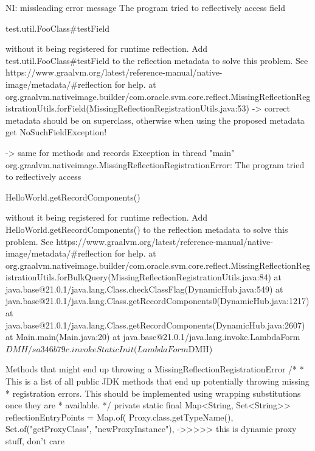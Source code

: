 NI: missleading error message
The program tried to reflectively access field

   test.util.FooClass#testField

 without it being registered for runtime reflection. Add test.util.FooClass#testField to the reflection metadata to solve this problem. See https://www.graalvm.org/latest/reference-manual/native-image/metadata/#reflection for help.
	at org.graalvm.nativeimage.builder/com.oracle.svm.core.reflect.MissingReflectionRegistrationUtils.forField(MissingReflectionRegistrationUtils.java:53)
-> correct metadata should be on superclass, otherwise when using the proposed metadata get NoSuchFieldException!

-> same for methods and records
Exception in thread "main" org.graalvm.nativeimage.MissingReflectionRegistrationError: The program tried to reflectively access

   HelloWorld.getRecordComponents()

 without it being registered for runtime reflection. Add HelloWorld.getRecordComponents() to the reflection metadata to solve this problem. See https://www.graalvm.org/latest/reference-manual/native-image/metadata/#reflection for help.
	at org.graalvm.nativeimage.builder/com.oracle.svm.core.reflect.MissingReflectionRegistrationUtils.forBulkQuery(MissingReflectionRegistrationUtils.java:84)
	at java.base@21.0.1/java.lang.Class.checkClassFlag(DynamicHub.java:549)
	at java.base@21.0.1/java.lang.Class.getRecordComponents0(DynamicHub.java:1217)
	at java.base@21.0.1/java.lang.Class.getRecordComponents(DynamicHub.java:2607)
	at Main.main(Main.java:20)
	at java.base@21.0.1/java.lang.invoke.LambdaForm$DMH/sa346b79c.invokeStaticInit(LambdaForm$DMH)


Methods that might end up throwing a MissingReflectionRegistrationError
    /*
     * This is a list of all public JDK methods that end up potentially throwing missing
     * registration errors. This should be implemented using wrapping substitutions once they are
     * available.
     */
    private static final Map<String, Set<String>> reflectionEntryPoints = Map.of(
                    Proxy.class.getTypeName(), Set.of("getProxyClass", "newProxyInstance"), ->>>>> this is dynamic proxy stuff, don't care


